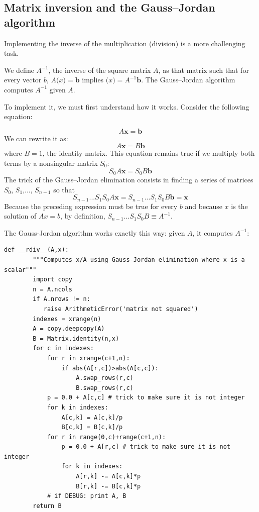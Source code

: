 \documentclass[justified,sixbynine]{tufte-book}
\def\ft{\small\tt}
\theoremstyle{plain}%
\theoremstyle{definition}
\theoremstyle{remark}
\begin{document}
\begin{fullwidth}
\goodbreak\subsection{Matrix inversion and the Gauss--Jordan algorithm}


Implementing the inverse of the multiplication (division) is a more challenging task.

We define $A^{-1}$, the inverse of the square matrix $A$, as that matrix such that for every vector $b$, $A\mathbf(x)=\mathbf{b}$ implies $\mathbf(x)=A^{-1}\mathbf{b}$. The Gauss--Jordan algorithm computes $A^{-1}$ given $A$.

To implement it, we must first understand how it works. Consider the following equation:

\begin{equation}
A \mathbf{x} = \mathbf{b}
\end{equation}
We can rewrite it as:
\begin{equation}
A \mathbf{x} = B \mathbf{b}
\end{equation}
where $B=1$, the identity matrix. This equation remains true if we multiply both terms by a nonsingular matrix $S_0$:
\begin{equation}
S_0 A \mathbf{x} = S_0 B \mathbf{b}
\end{equation}
The trick of the Gauss--Jordan elimination consists in finding a series of matrices $S_0$, $S_1$,..., $S_{n-1}$ so that
\begin{equation}
S_{n-1} ... S_1 S_0 A \mathbf{x} = S_{n-1} ... S_1 S_0 B \mathbf{b} = \mathbf{x}
\end{equation}
Because the preceding expression must be true for every $b$ and because $x$ is the solution of $A x=b$, by definition,
$S_{n-1} \ldots S_1 S_0 B \equiv A^{-1}$.

The Gauss-Jordan algorithm works exactly this way: given $A$, it computes $A^{-1}$:

\begin{lstlisting}[caption={in file: {\ft nlib.py}}]
    def __rdiv__(A,x):
        """Computes x/A using Gauss-Jordan elimination where x is a scalar"""
        import copy
        n = A.ncols
        if A.nrows != n:
           raise ArithmeticError('matrix not squared')
        indexes = xrange(n)
        A = copy.deepcopy(A)
        B = Matrix.identity(n,x)
        for c in indexes:
            for r in xrange(c+1,n):
                if abs(A[r,c])>abs(A[c,c]):
                    A.swap_rows(r,c)
                    B.swap_rows(r,c)
            p = 0.0 + A[c,c] # trick to make sure it is not integer
            for k in indexes:
                A[c,k] = A[c,k]/p
                B[c,k] = B[c,k]/p
            for r in range(0,c)+range(c+1,n):
                p = 0.0 + A[r,c] # trick to make sure it is not integer
                for k in indexes:
                    A[r,k] -= A[c,k]*p
                    B[r,k] -= B[c,k]*p
            # if DEBUG: print A, B
        return B


\end{lstlisting}
\end{fullwidth}
\end{document}
